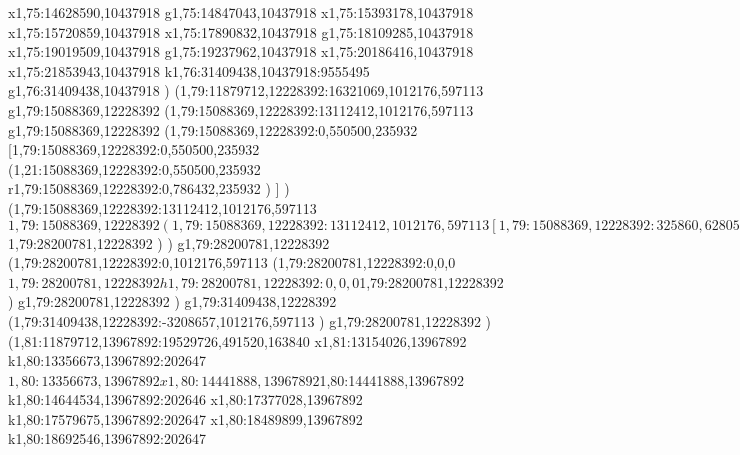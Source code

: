 {x1,75:14628590,10437918
g1,75:14847043,10437918
x1,75:15393178,10437918
x1,75:15720859,10437918
x1,75:17890832,10437918
g1,75:18109285,10437918
x1,75:19019509,10437918
g1,75:19237962,10437918
x1,75:20186416,10437918
x1,75:21853943,10437918
k1,76:31409438,10437918:9555495
g1,76:31409438,10437918
)
(1,79:11879712,12228392:16321069,1012176,597113
g1,79:15088369,12228392
(1,79:15088369,12228392:13112412,1012176,597113
g1,79:15088369,12228392
(1,79:15088369,12228392:0,550500,235932
[1,79:15088369,12228392:0,550500,235932
(1,21:15088369,12228392:0,550500,235932
r1,79:15088369,12228392:0,786432,235932
)
]
)
(1,79:15088369,12228392:13112412,1012176,597113
$1,79:15088369,12228392
(1,79:15088369,12228392:13112412,1012176,597113
[1,79:15088369,12228392:325860,628054,0
(1,79:15060154,12055449:0,455111,0
x1,79:15551675,12055449
)
(1,79:15088369,12228392:325860,455111,0
x1,79:15396024,12228392
)
]
x1,79:16160613,12228392
g1,79:16342653,12228392
x1,79:17034424,12228392
g1,79:17216464,12228392
x1,79:17524119,12228392
(1,79:17524119,12326695:294003,295640,0
x1,79:17785354,12326695
)
g1,79:17963754,12228392
x1,79:18473480,12228392
g1,79:18619112,12228392
(1,79:18619112,11336367:364090,0,1456371
x1,79:18983202,11336367
)
[1,79:18983202,12825505:522013,1609289,0
(1,79:19274473,11498385:230742,282169,0
x1,79:19472447,11498385
)
(1,79:18983202,12825505:294003,295640,0
x1,79:19244437,12825505
)
]
g1,79:19614439,12228392
x1,79:19927025,12228392
x1,79:20513056,12228392
x1,79:22251356,12228392
g1,79:22396988,12228392
x1,79:22906714,12228392
g1,79:23052346,12228392
[1,79:23052346,12228392:569796,539580,0
(1,79:23173404,12060910:0,372098,0
x1,79:23501085,12060910
)
(1,79:23052346,12228392:569796,449650,0
x1,79:23622142,12228392
)
]
x1,79:24368526,12228392
g1,79:24550566,12228392
x1,79:25060292,12228392
g1,79:25242332,12228392
x1,79:25549987,12228392
x1,79:26314576,12228392
g1,79:26460208,12228392
x1,79:26969934,12228392
g1,79:27115566,12228392
x1,79:28200781,12228392
)
$1,79:28200781,12228392
)
)
g1,79:28200781,12228392
(1,79:28200781,12228392:0,1012176,597113
(1,79:28200781,12228392:0,0,0
$1,79:28200781,12228392
h1,79:28200781,12228392:0,0,0
$1,79:28200781,12228392
)
g1,79:28200781,12228392
)
g1,79:31409438,12228392
(1,79:31409438,12228392:-3208657,1012176,597113
)
g1,79:28200781,12228392
)
(1,81:11879712,13967892:19529726,491520,163840
x1,81:13154026,13967892
k1,80:13356673,13967892:202647
$1,80:13356673,13967892
x1,80:14441888,13967892
$1,80:14441888,13967892
k1,80:14644534,13967892:202646
x1,80:17377028,13967892
k1,80:17579675,13967892:202647
x1,80:18489899,13967892
k1,80:18692546,13967892:202647
}
